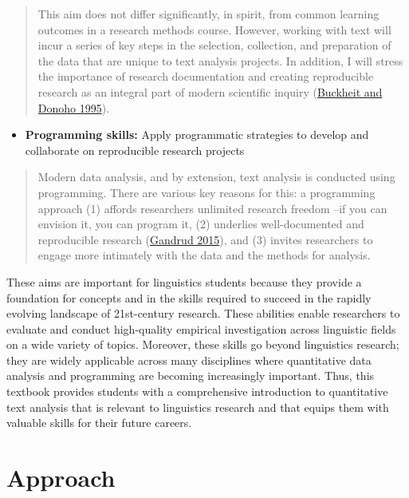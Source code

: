 \documentclass[
  letterpaper,
  DIV=11,
  numbers=noendperiod]{scrreport}
\providecommand{\tightlist}{%
  \setlength{\itemsep}{0pt}\setlength{\parskip}{0pt}}\usepackage{longtable,booktabs,array}
\theoremstyle{definition}
\theoremstyle{remark}
\begin{document}
\begin{quote}
This aim does not differ significantly, in spirit, from common learning
outcomes in a research methods course. However, working with text will
incur a series of key steps in the selection, collection, and
preparation of the data that are unique to text analysis projects. In
addition, I will stress the importance of research documentation and
creating reproducible research as an integral part of modern scientific
inquiry (\protect\hyperlink{ref-Buckheit1995}{Buckheit and Donoho
1995}).
\end{quote}

\begin{itemize}
\tightlist
\item
  \textbf{Programming skills:} Apply programmatic strategies to develop
  and collaborate on reproducible research projects
\end{itemize}

\begin{quote}
Modern data analysis, and by extension, text analysis is conducted using
programming. There are various key reasons for this: a programming
approach (1) affords researchers unlimited research freedom --if you can
envision it, you can program it, (2) underlies well-documented and
reproducible research (\protect\hyperlink{ref-Gandrud2015}{Gandrud
2015}), and (3) invites researchers to engage more intimately with the
data and the methods for analysis.
\end{quote}

These aims are important for linguistics students because they provide a
foundation for concepts and in the skills required to succeed in the
rapidly evolving landscape of 21st-century research. These abilities
enable researchers to evaluate and conduct high-quality empirical
investigation across linguistic fields on a wide variety of topics.
Moreover, these skills go beyond linguistics research; they are widely
applicable across many disciplines where quantitative data analysis and
programming are becoming increasingly important. Thus, this textbook
provides students with a comprehensive introduction to quantitative text
analysis that is relevant to linguistics research and that equips them
with valuable skills for their future careers.

\hypertarget{sec-p-approach}{%
\section*{Approach}\label{sec-p-approach}}
\end{document}
